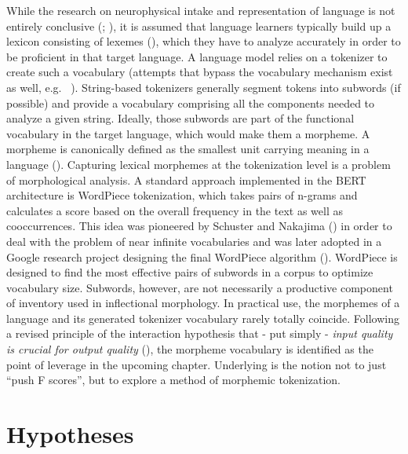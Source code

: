 While the research on neurophysical intake and representation of language is not entirely conclusive (\textcite[1--3]{n400}; \textcite{L2morphology}), it is assumed that language learners typically build up a lexicon consisting of lexemes (\cite[82 -- 100]{brennan2022language}), which they have to analyze accurately in order to be proficient in that target language.
A language model relies on a tokenizer to create such a vocabulary (attempts that bypass the vocabulary mechanism exist as well, e.g. \ \textcite{handsfreesegmentation}).
String-based tokenizers generally segment tokens into subwords (if possible) and provide a vocabulary comprising all the components needed to analyze a given string.
Ideally, those subwords are part of the functional vocabulary in the target language, which would make them a morpheme.
A morpheme is canonically defined as the smallest unit carrying meaning in a language (\cite{morpheme}).
Capturing lexical morphemes at the tokenization level is a problem of morphological analysis.
A standard approach implemented in the BERT architecture is WordPiece tokenization, which takes pairs of n-grams and calculates a score based on the overall frequency in the text as well as cooccurrences.
This idea was pioneered by Schuster and Nakajima (\citeyear{WORDPIECEOG}) in order to deal with the problem of near infinite vocabularies and was later adopted in a Google research project designing the final WordPiece algorithm (\cite{WORDPIECEGOOGLE}).
WordPiece is designed to find the most effective pairs of subwords in a corpus to optimize vocabulary size.
Subwords, however, are not necessarily a productive component of inventory used in inflectional morphology.
In practical use, the morphemes of a language and its generated tokenizer vocabulary rarely totally coincide.
Following a revised principle of the interaction hypothesis that - put simply - \textit{input quality is crucial for output quality} (\cite[114]{inputoutput}), the morpheme vocabulary is identified as the point of leverage in the upcoming chapter.
Underlying is the notion not to just \textquotedblleft push F scores\textquotedblright, but to explore a method of morphemic tokenization.


\section{Hypotheses}
\label{sec:hypothesis}

